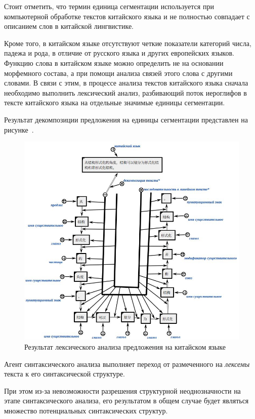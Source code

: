 Стоит отметить, что термин единица сегментации используется при компьютерной обработке текстов китайского языка и не полностью совпадает с описанием слов в китайской лингвистике.

Кроме того, в китайском языке отсутствуют четкие показатели категорий числа, падежа и рода, в отличие от русского языка и других европейских языков.
Функцию слова в китайском языке можно определить не на основании морфемного состава, а при помощи анализа связей этого слова с другими словами.
В связи с этим, в процессе анализа текстов китайского языка сначала необходимо выполнить лексический анализ, разбивающий поток иероглифов в тексте китайского языка на отдельные значимые единицы сегментации.

Результат декомпозиции предложения на единицы сегментации представлен на рисунке~\textit{}.

\begin{figure}[H]
	\centering
	\includegraphics[scale=0.6]{images/part4/chapter_chinese/segment_chinese_sentence}
	\caption{Результат лексического анализа предложения на китайском языке}
	\label{fig:segment-chinese}
\end{figure}

Агент синтаксического анализа выполняет переход от размеченного на \textit{лексемы} текста к его синтаксической структуре.

При этом из-за невозможности разрешения структурной неоднозначности на этапе синтаксического анализа, его результатом в общем случае будет являться множество потенциальных синтаксических структур.

